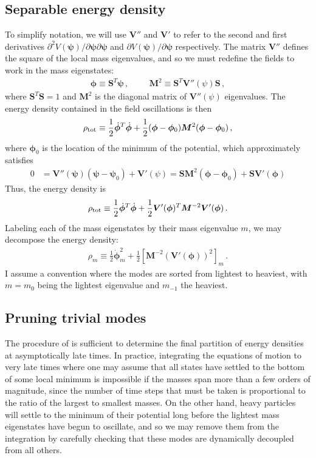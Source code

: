 \documentclass{article}
\begin{document}
\subsection{Separable energy density}\label{sec:separable-energy-density}
To simplify notation, we will use $\bm V''$ and $\bm V'$ to refer to the second and first derivatives $\partial^2 V(\bm\psi)/\partial\bm\psi\partial\bm\psi$ and $\partial V(\bm\psi)/\partial\bm\psi$ respectively. The matrix $\bm V''$ defines the square of the local mass eigenvalues, and so we must redefine the fields to work in the mass eigenstates:
\begin{align}
    \bm\phi\equiv \bm S^T\bm\psi \,,\hspace{1cm} \bm M^2\equiv \bm S^T\bm V''(\psi)\bm S\,,
\end{align}
where $\bm S^T\bm S = 1$ and $\bm M^2$ is the diagonal matrix of $\bm V''(\psi)$ eigenvalues. The energy density contained in the field oscillations is then
\begin{align}
    \rho_{\rm tot}\equiv \frac12 \dot{\bm\phi}^T\dot{\bm\phi} + \frac12 (\bm\phi - \bm\phi_0)\bm M^2(\bm\phi - \bm\phi_0)\,,
\end{align}
where $\bm\phi_0$ is the location of the minimum of the potential, which approximately satisfies
\begin{align}
    0&=\bm V''(\bm\psi)(\bm \psi - \bm\psi_0) + \bm V'(\psi) = \bm S \bm M^2 (\bm\phi - \bm \phi_0) + \bm S\bm V'(\bm\phi)
\end{align}
Thus, the energy density is
\begin{align}
    \rho_{\rm tot}\equiv \frac12 \dot{\bm\phi}^T\dot{\bm\phi} + \frac12\bm V'(\bm\phi)^T\bm M^{-2}\bm V'(\bm\phi)\,.
\end{align}
Labeling each of the mass eigenstates by their mass eigenvalue $m$, we may decompose the energy density:
\begin{align}\label{eqn:separated-energy-densities}
    \rho_{m}\equiv \frac12 \dot{\bm\phi}_m^2 + \frac12 [\bm M^{-2}(\bm V'(\bm\phi))^2]_m\,.
\end{align}
I assume a convention where the modes are sorted from lightest to heaviest, with $m = m_0$ being the lightest eigenvalue and $m_{-1}$ the heaviest.

\subsection{Pruning trivial modes}
The procedure of  is sufficient to determine the final partition of energy densities at asymptotically late times. In practice, integrating the equations of motion to very late times where one may assume that all states have settled to the bottom of some local minimum is impossible if the masses span more than a few orders of magnitude, since the number of time steps that must be taken is proportional to the ratio of the largest to smallest masses. On the other hand, heavy particles will settle to the minimum of their potential long before the lightest mass eigenstates have begun to oscillate, and so we may remove them from the integration by carefully checking that these modes are dynamically decoupled from all others.
\end{document}
